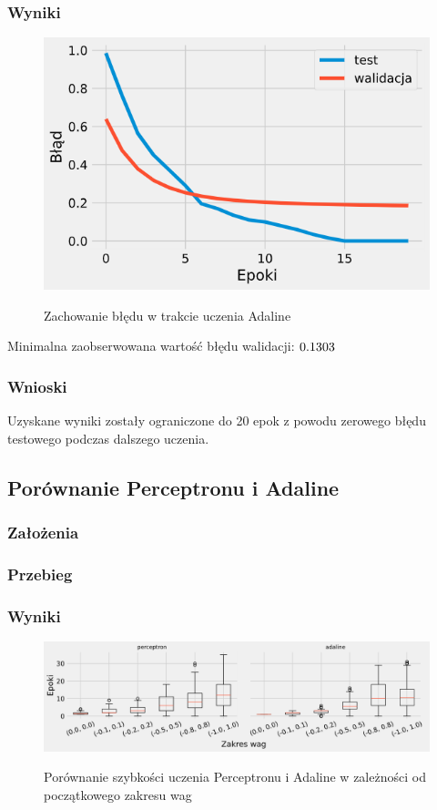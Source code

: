 \documentclass{article}
\begin{document}
\subsubsection*{Wyniki}

\begin{figure}[!h]
	\centering
	\caption{Zachowanie błędu w trakcie uczenia Adaline}
	\includegraphics[width=.5\textwidth]{ada_epsilon.png}
	\label{fig:res7}
\end{figure}

Minimalna zaobserwowana wartość błędu walidacji: \($0.1303$\)

\subsubsection*{Wnioski}

Uzyskane wyniki zostały ograniczone do 20 epok z powodu zerowego błędu testowego podczas dalszego uczenia.

\newpage
\subsection{Porównanie Perceptronu i Adaline}
\subsubsection*{Założenia}
\subsubsection*{Przebieg}
\subsubsection*{Wyniki}

\begin{figure}[!h]
	\centering
	\caption{Porównanie szybkości uczenia Perceptronu i Adaline w zależności od początkowego zakresu wag}
	\includegraphics[width=\textwidth]{ada_per_w.png}
	\label{fig:res81}
\end{figure}
\end{document}

